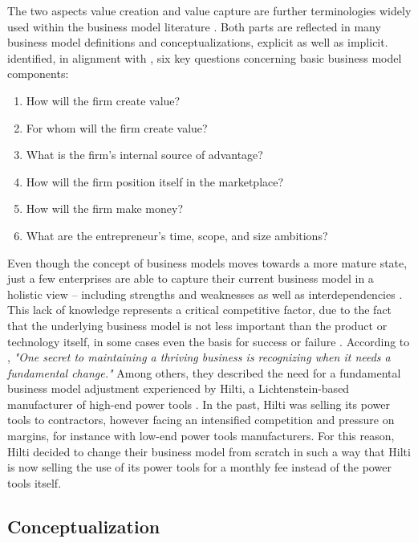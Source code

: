 The two aspects value creation and value capture are further terminologies widely used within the business model literature . Both parts are reflected in many business model definitions and conceptualizations, explicit as well as implicit. \citet[pp. 729-732]{Morris2005} identified, in alignment with \citet[pp. 49-61]{Drucker1954}, six key questions concerning basic business model components:

\begin{enumerate}[parsep=0pt, topsep=0pt, itemsep=0pt]
	\item How will the firm create value?
	\item For whom will the firm create value?
	\item What is the firm's internal source of advantage?
	\item How will the firm position itself in the marketplace?
	\item How will the firm make money?
	\item What are the entrepreneur's time, scope, and size ambitions?
\end{enumerate}

Even though the concept of business models moves towards a more mature state, just a few enterprises are able to capture their current business model in a holistic view -- including strengths and weaknesses as well as interdependencies \citep[p. 52]{Johnson2008}. This lack of knowledge represents a critical competitive factor, due to the fact that the underlying business model is not less important than the product or technology itself, in some cases even the basis for success or failure . According to \citet[p. 50]{Johnson2008}, \textit{"One secret to maintaining a thriving business is recognizing when it needs a fundamental change."} Among others, they described the need for a fundamental business model adjustment experienced by Hilti, a Lichtenstein-based manufacturer of high-end power tools \citep[pp. 54-57]{Johnson2008}. In the past, Hilti was selling its power tools to contractors, however facing an intensified competition and pressure on margins, for instance with low-end power tools manufacturers. For this reason, Hilti decided to change their business model from scratch in such a way that Hilti is now selling the use of its power tools for a monthly fee instead of the power tools itself.

\subsection{Conceptualization}\label{ch:sota:bmc}

